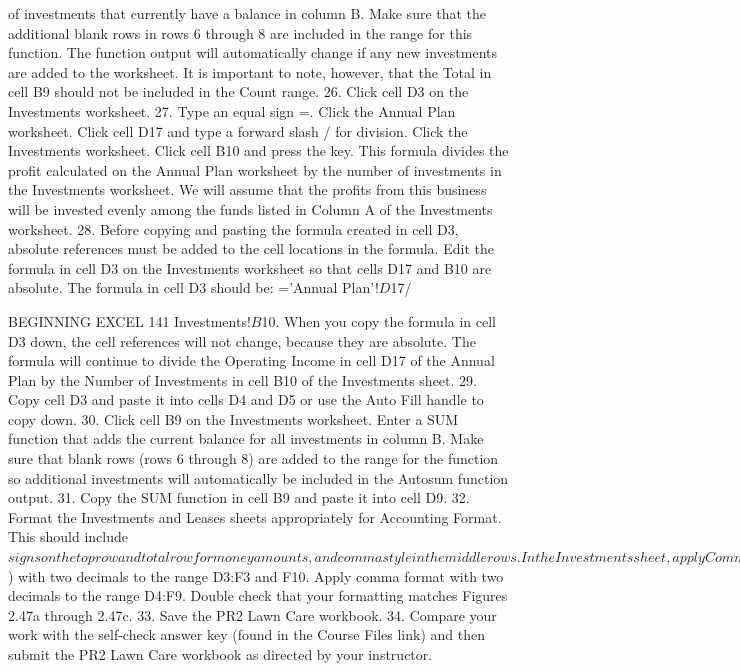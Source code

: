 of investments that currently have a balance in column B. Make sure that the additional blank
rows in rows 6 through 8 are included in the range for this function. The function output will
automatically change if any new investments are added to the worksheet. It is important to note,
however, that the Total in cell B9 should not be included in the Count range.
26. Click cell D3 on the Investments worksheet.
27. Type an equal sign =. Click the Annual Plan worksheet. Click cell D17 and type a forward slash
/ for division. Click the Investments worksheet. Click cell B10 and press the  key. This
formula divides the profit calculated on the Annual Plan worksheet by the number of
investments in the Investments worksheet. We will assume that the profits from this business
will be invested evenly among the funds listed in Column A of the Investments worksheet.
28. Before copying and pasting the formula created in cell D3, absolute references must be added to
the cell locations in the formula. Edit the formula in cell D3 on the Investments worksheet so
that cells D17 and B10 are absolute. The formula in cell D3 should be: ='Annual Plan'!$D$17/

BEGINNING EXCEL 141
Investments!$B$10. When you copy the formula in cell D3 down, the cell references will not
change, because they are absolute. The formula will continue to divide the Operating Income in
cell D17 of the Annual Plan by the Number of Investments in cell B10 of the Investments sheet.
29.   Copy cell D3 and paste it into cells D4 and D5 or use the Auto Fill handle to copy down.
30.   Click cell B9 on the Investments worksheet. Enter a SUM function that adds the current balance
for all investments in column B. Make sure that blank rows (rows 6 through 8) are added to the
range for the function so additional investments will automatically be included in the Autosum
function output.
31.   Copy the SUM function in cell B9 and paste it into cell D9.
32.   Format the Investments and Leases sheets appropriately for Accounting Format. This should
include $ signs on the top row and total row for money amounts, and comma style in the middle
rows. In the Investments sheet, apply Comma Style with 0 decimals to the ranges B4:B5 and
D4:D5. In the Leases worksheet, apply Accounting Number Format ($) with two decimals to the
range D3:F3 and F10. Apply comma format with two decimals to the range D4:F9. Double check
that your formatting matches Figures 2.47a through 2.47c.
33.   Save the PR2 Lawn Care workbook.
34.   Compare your work with the self-check answer key (found in the Course Files link) and then
submit the PR2 Lawn Care workbook as directed by your instructor.





